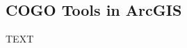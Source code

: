 \documentclass[class=book , crop=false]{standalone}
\title{}  %
\begin{document}


\ifstandalone
\maketitle %
\clearpage
\tableofcontents %
\clearpage
\fi



\subsection{COGO Tools in ArcGIS}
TEXT 
\end{document}
